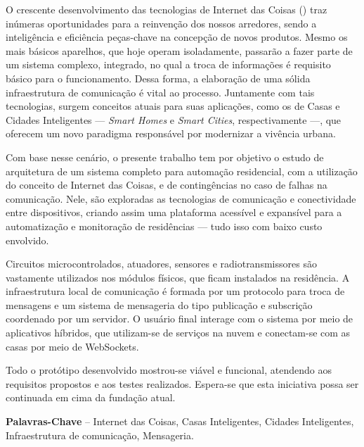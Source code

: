\begin{resumo}

O crescente desenvolvimento das tecnologias de Internet das Coisas (\wiot) traz inúmeras oportunidades para a reinvenção dos nossos arredores, sendo a inteligência e eficiência peças-chave na concepção de novos produtos. Mesmo os mais básicos aparelhos, que hoje operam isoladamente, passarão a fazer parte de um sistema complexo, integrado, no qual a troca de informações é requisito básico para o funcionamento. Dessa forma, a elaboração de uma sólida infraestrutura de comunicação é vital ao processo. Juntamente com tais tecnologias, surgem conceitos atuais para suas aplicações, como os de Casas e Cidades Inteligentes --- \textit{Smart Homes} e \textit{Smart Cities}, respectivamente ---, que oferecem um novo paradigma responsável por modernizar a vivência urbana.

Com base nesse cenário, o presente trabalho tem por objetivo o estudo de arquitetura de um sistema completo para automação residencial, com a utilização do conceito de Internet das Coisas, e de contingências no caso de falhas na comunicação. Nele, são exploradas as tecnologias de comunicação e conectividade entre dispositivos, criando assim uma plataforma acessível e expansível para a automatização e monitoração de residências --- tudo isso com baixo custo envolvido.

Circuitos microcontrolados, atuadores, sensores e radiotransmissores são vastamente utilizados nos módulos físicos, que ficam instalados na residência. A infraestrutura local de comunicação é formada por um protocolo para troca de mensagens e um sistema de mensageria do tipo publicação e subscrição coordenado por um servidor. O usuário final interage com o sistema por meio de aplicativos híbridos, que utilizam-se de serviços na nuvem e conectam-se com as casas por meio de WebSockets.

Todo o protótipo desenvolvido mostrou-se viável e funcional, atendendo aos requisitos propostos e aos testes realizados. Espera-se que esta iniciativa possa ser continuada em cima da fundação atual.

%
\textbf{Palavras-Chave} -- Internet das Coisas, Casas Inteligentes, Cidades Inteligentes, Infraestrutura de comunicação, Mensageria.
\end{resumo}
